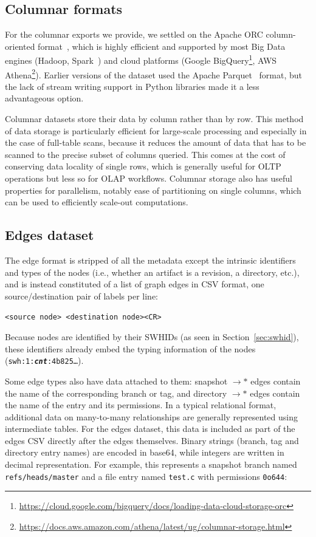 \subsection{Columnar formats}
For the columnar exports we provide, we settled on the Apache ORC
column-oriented format~\cite{huai2014orc}, which is highly efficient and
supported by most Big Data engines (Hadoop, Spark~\cite{zaharia2016apache}) and
cloud platforms (Google
BigQuery\footnote{\url{https://cloud.google.com/bigquery/docs/loading-data-cloud-storage-orc}},
AWS
Athena\footnote{\url{https://docs.aws.amazon.com/athena/latest/ug/columnar-storage.html}}).
Earlier versions of the dataset used the Apache
Parquet~\cite{twitter2013parquet,website-apache-parquet} format, but the lack
of stream writing support in Python libraries made it a less advantageous
option.

Columnar datasets store their data by column rather than by row. This method of
data storage is particularly efficient for large-scale processing and
especially in the case of full-table scans, because it reduces the amount of
data that has to be scanned to the precise subset of columns queried. This
comes at the cost of conserving data locality of single rows, which is
generally useful for \gls{OLTP} operations but less so for \gls{OLAP}
workflows. Columnar storage also has useful properties for parallelism, notably
ease of partitioning on single columns, which can be used to efficiently
scale-out computations.

\subsection{Edges dataset}
The edge format is stripped of all the metadata except the intrinsic
identifiers and types of the nodes (i.e., whether an artifact is a revision, a
directory, etc.), and is instead constituted of a list of graph edges in CSV
format, one source/destination pair of labels per line:

\texttt{<source node> <destination node><CR>}

Because nodes are identified by their \glspl{SWHID} (as seen in
Section~\ref{sec:swhid}), these identifiers already embed the typing
information of the nodes (\texttt{swh:1:\emph{\textbf{cnt}}:4b825…}).

Some edge types also have data attached to them: snapshot $\rightarrow\ast$
edges contain the name of the corresponding branch or tag, and
directory $\rightarrow\ast$ edges contain the name of the entry and its
permissions.
In a typical relational format, additional data on many-to-many relationships
are generally represented using intermediate tables. For the edges dataset,
this data is included as part of the edges CSV directly after the edges
themselves. Binary strings (branch, tag and directory entry names) are encoded
in base64, while integers are written in decimal representation. For example,
this represents a snapshot branch named \texttt{refs/heads/master} and a file
entry named \texttt{test.c} with permissions \texttt{0o644}:

